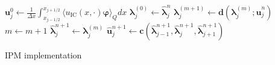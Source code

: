 \begin{algorithm}[H]
\begin{algorithmic}[1]
\State $\bm{u}_j^0 \leftarrow \frac{1}{\Delta x} \int_{x_{j-1/ 2}}^{x_{j+1/ 2}} \langle u_{\text{IC}}(x, \cdot) \bm{\varphi} \rangle_Q dx$
\EndFor
{}
\State $\bm{\lambda}_j^{(0)} \leftarrow \bm{\hat \lambda}_j^{n}$
\State $\bm{\lambda}_j^{(m+1)} \leftarrow \bm{d}(\bm{\lambda}_{j}^{(m)};\bm{\hat u}_j^{n})$
\State $m \leftarrow m+1$
\EndWhile
\State $\bm{\hat \lambda}_j^{n+1} \leftarrow \bm{\lambda}_j^{(m)}$
\EndFor
{}
\State $\bm{\hat u}_j^{n+1} \leftarrow \bm{c}(\bm{\hat \lambda}_{j-1}^{n+1},\bm{\hat \lambda}_j^{n+1},\bm{\hat \lambda}_{j+1}^{n+1})$
\EndFor
\EndFor
\end{algorithmic}
\caption{IPM implementation}
\label{alg:IPM}
\end{algorithm}

